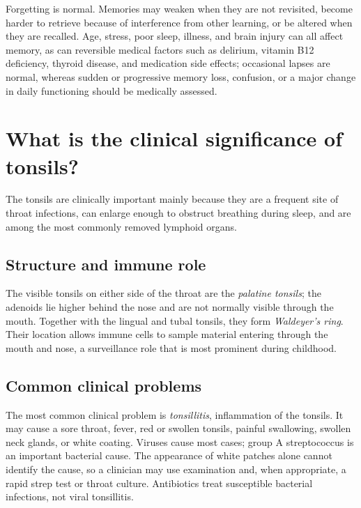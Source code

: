 \documentclass[11pt,oneside]{report}
\begin{document}
Forgetting is normal. Memories may weaken when they are not revisited, become
harder to retrieve because of interference from other learning, or be altered
when they are recalled. Age, stress, poor sleep, illness, and brain injury can
all affect memory, as can reversible medical factors such as delirium, vitamin
B12 deficiency, thyroid disease, and medication side effects; occasional lapses
are normal, whereas sudden or progressive memory loss, confusion, or a major
change in daily functioning should be medically assessed.

\section{What is the clinical significance of tonsils?}

The tonsils are clinically important mainly because they are a frequent site of
throat infections, can enlarge enough to obstruct breathing during sleep, and
are among the most commonly removed lymphoid organs.

\subsection*{Structure and immune role}

The visible tonsils on either side of the throat are the \emph{palatine tonsils};
the adenoids lie higher behind the nose and are not normally visible through the
mouth. Together with the lingual and tubal tonsils, they form \emph{Waldeyer's
ring}. Their location allows immune cells to sample material entering through
the mouth and nose, a surveillance role that is most prominent during
childhood.

\subsection*{Common clinical problems}

The most common clinical problem is \emph{tonsillitis}, inflammation of the
tonsils. It may cause a sore throat, fever, red or swollen tonsils, painful
swallowing, swollen neck glands, or white coating. Viruses cause most cases;
group A streptococcus is an important bacterial cause. The appearance of white
patches alone cannot identify the cause, so a clinician may use examination and,
when appropriate, a rapid strep test or throat culture. Antibiotics treat
susceptible bacterial infections, not viral tonsillitis.
\end{document}
